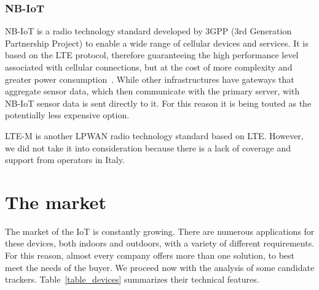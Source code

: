 \subsubsection{NB-IoT}
NB-IoT is a radio technology standard developed by 3GPP (3rd Generation Partnership Project) to enable a wide range of cellular devices and services. It is based on the LTE protocol, therefore guaranteeing the high performance level associated with cellular connections, but at the cost of more complexity and greater power consumption~\cite{nbiot}. While other infrastructures have gateways that aggregate sensor data, which then communicate with the primary server, with NB-IoT sensor data is sent directly to it. For this reason it is being touted as the potentially less expensive option.

LTE-M is another LPWAN radio technology standard based on LTE. However, we did not take it into consideration because there is a lack of coverage and support from operators in Italy.



\section{The market}
\label{sec:market}

The market of the IoT is constantly growing. There are numerous applications for these devices, both indoors and outdoors, with a variety of different requirements. For this reason, almost every company offers more than one solution, to best meet the needs of the buyer. We proceed now with the analysis of some candidate trackers. Table~\ref{table_devices} summarizes their technical features.

